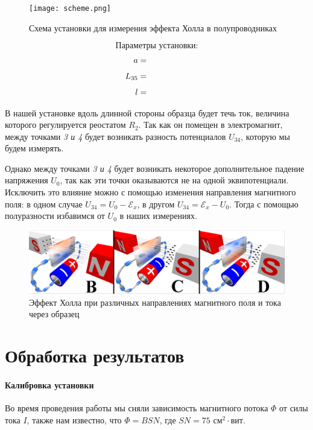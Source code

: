 \documentclass{physlab}
\begin{document}
\begin{figure}
\centering
    \texttt{[image: scheme.png]}
\caption{Схема установки для измерения эффекта Холла в полупроводниках}
\end{figure} 

$$\text{Параметры установки:}$$
\begin{align*}
a &= \val \\[1ex]
L_{35} &= \val \\[1ex]
l &= \val
\end{align*}
\vspace{5.7 cm}

В нашей установке вдоль длинной стороны образца будет течь ток, величина которого регулируется реостатом $R_2$. Так как он помещен в электромагнит, между точками \textit{3 и 4} будет возникать разность потенциалов $U_{34}$, которую мы будем измерять. 

Однако между точками \textit{3 и 4} будет возникать некоторое дополнительное падение напряжения $U_{0}$, так как эти точки оказываются не на одной эквипотенциали. Исключить это влияние можно с помощью изменения направления магнитного поля: в одном случае $U_{34} = U_{0} - \mathscr{E}_x $, в другом  $U_{34} = \mathscr{E}_x - U_0$. Тогда с помощью полуразности избавимся от $U_{0}$ в наших измерениях. 

\begin{figure}[H]
	\begin{center}
		\includegraphics[width = 0.6 \textwidth]{hall_dif}
		\caption{Эффект Холла при различных направлениях магнитного поля и тока через образец}
	\end{center}
\end{figure}


\section{Обработка результатов}

\paragraph{Калибровка установки}
Во время проведения работы мы сняли зависимость магнитного потока $\varPhi$ от силы тока $I$, также нам известно, что $\varPhi=BSN$, где $SN=75\text{ см}^2\cdot\text{вит}$.
\end{document}
